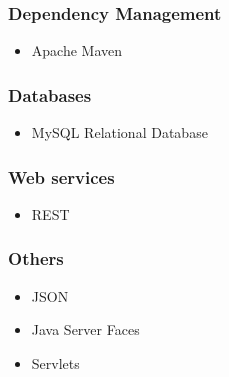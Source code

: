 	\subsubsection{Dependency Management}
	\begin{itemize}
	\item Apache Maven
	\end{itemize}
	\subsubsection{Databases}
	\begin{itemize}
	\item MySQL Relational Database
	\end{itemize}
	\subsubsection{Web services}
	\begin{itemize}
	\item REST
	\end{itemize}
	\subsubsection{Others}
	\begin{itemize}
	\item JSON
	\item Java Server Faces
	\item Servlets
	\end{itemize}		
